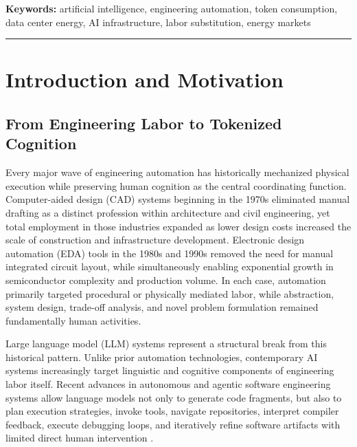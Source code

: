 \documentclass{article}
\begin{document}
\vspace{0.5em}
\noindent\textbf{Keywords:} artificial intelligence, engineering automation, token consumption, data center energy, AI infrastructure, labor substitution, energy markets



\vspace{1em}
\hrule

\tableofcontents
\newpage

\section{Introduction and Motivation}
\label{sec:introduction}

\subsection{From Engineering Labor to Tokenized Cognition}

Every major wave of engineering automation has historically mechanized physical execution while preserving human cognition as the central coordinating function. Computer-aided design (CAD) systems beginning in the 1970s eliminated manual drafting as a distinct profession within architecture and civil engineering, yet total employment in those industries expanded as lower design costs increased the scale of construction and infrastructure development. Electronic design automation (EDA) tools in the 1980s and 1990s removed the need for manual integrated circuit layout, while simultaneously enabling exponential growth in semiconductor complexity and production volume. In each case, automation primarily targeted procedural or physically mediated labor, while abstraction, system design, trade-off analysis, and novel problem formulation remained fundamentally human activities.

Large language model (LLM) systems represent a structural break from this historical pattern. Unlike prior automation technologies, contemporary AI systems increasingly target linguistic and cognitive components of engineering labor itself. Recent advances in autonomous and agentic software engineering systems allow language models not only to generate code fragments, but also to plan execution strategies, invoke tools, navigate repositories, interpret compiler feedback, execute debugging loops, and iteratively refine software artifacts with limited direct human intervention \citep{wang2025agentic, patil2025bfcl}.
\end{document}

